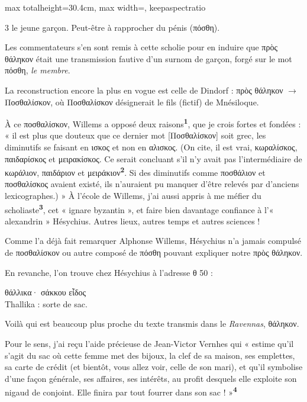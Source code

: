 \documentclass[11pt,twoside]{book}
\newcommand{\italique}[1]{\textit{#1}}
\newcommand{\citComm}[1]{\begin{quoting}[vskip=0.4pt,leftmargin=0.7em,rightmargin=0.2em]#1\end{quoting}}
\newcommand{\marqueur}[1]{\textsuperscript{\color{rubricRed}\textbf{#1}}}
\begin{document}
\begin{adjustbox}{max totalheight=30.4cm, max width=\textwidth, keepaspectratio}
\begin{minipage}{\textwidth}
{\begin{multicols}{3}
{le jeune garçon. Peut-être à rapprocher du pénis (πόσθη).}
\par\vspace{1.5pt}
\noindent Les commentateurs s'en sont remis à cette scholie pour en induire que πρὸς θάληκον était une transmission fautive d'un surnom de garçon, forgé sur le mot πόσθη, \italique{le membre}.
\par\vspace{1.5pt}
\noindent La reconstruction encore la plus en vogue est celle de Dindorf : πρὸς θάληκον $ \to $ Ποσθαλίσκον, où Ποσθαλίσκον désignerait le fils (fictif) de Mnésiloque.
\par\vspace{1.5pt}
\noindent À ce ποσθαλίσκον, Willems a opposé deux raisons\marqueur{1}, que je crois fortes et fondées : « il est plus que douteux que ce dernier mot [Ποσθαλίσκον] soit grec, les diminutifs se faisant en ισκος et non en αλισκος. (On cite, il est vrai, κωραλίσκος, παιδαρίσκος et μειρακίσκος. Ce serait concluant s'il n'y avait pas l'intermédiaire de κωράλιον, παιδάριον et μειράκιον\marqueur{2}. Si des diminutifs comme ποσθάλιον et ποσθαλίσκος avaient existé, ils n'auraient pu manquer d'être relevés par d'anciens lexicographes.) » À l'école de Willems, j'ai aussi appris à me méfier du scholiaste\marqueur{3}, cet « ignare byzantin », et faire bien davantage confiance à l'« alexandrin » Hésychius. Autres lieux, autres temps et autres sciences !
\par\vspace{1.5pt}
\noindent Comme l'a déjà fait remarquer Alphonse Willems, Hésychius n'a jamais compulsé de ποσθαλίσκον ou autre composé de πόσθη pouvant expliquer notre πρὸς θάληκον.
\par\vspace{1.5pt}
\noindent En revanche, l'on trouve chez Hésychius à l'adresse θ 50 :
\citComm{θάλλικα· σάκκου εἶδος\\
Thallika : sorte de sac.}
\par\vspace{1.5pt}
\noindent Voilà qui est beaucoup plus proche du texte transmis dans le \italique{Ravennas}, θάληκον.
\par\vspace{1.5pt}
\noindent Pour le sens, j'ai reçu l'aide précieuse de Jean-Victor Vernhes qui « estime qu'il s'agit du sac où cette femme met des bijoux, la clef de sa maison, ses emplettes, sa carte de crédit (et bientôt, vous allez voir, celle de son mari), et qu'il symbolise d'une façon générale, ses affaires, ses intérêts, au profit desquels elle exploite son nigaud de conjoint. Elle finira par tout fourrer dans son sac ! »\marqueur{4}

\end{multicols}}
\end{minipage}
\end{adjustbox}
\end{document}
